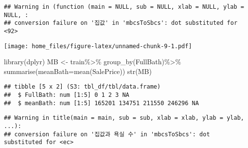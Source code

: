 \documentclass[
]{article}
\newenvironment{Shaded}{\begin{snugshade}}{\end{snugshade}}
\newcommand{\AttributeTok}[1]{\textcolor[rgb]{0.77,0.63,0.00}{#1}}
\newcommand{\FunctionTok}[1]{\textcolor[rgb]{0.00,0.00,0.00}{#1}}
\newcommand{\NormalTok}[1]{#1}
\newcommand{\OtherTok}[1]{\textcolor[rgb]{0.56,0.35,0.01}{#1}}
\newcommand{\SpecialCharTok}[1]{\textcolor[rgb]{0.00,0.00,0.00}{#1}}
\newcommand{\StringTok}[1]{\textcolor[rgb]{0.31,0.60,0.02}{#1}}
\begin{document}
\begin{verbatim}
## Warning in (function (main = NULL, sub = NULL, xlab = NULL, ylab = NULL, :
## conversion failure on '집값' in 'mbcsToSbcs': dot substituted for <92>
\end{verbatim}

\texttt{[image: home\_files/figure-latex/unnamed-chunk-9-1.pdf]}

\begin{Shaded}
\begin{Highlighting}[]
\FunctionTok{library}\NormalTok{(dplyr)}
\NormalTok{MB }\OtherTok{\textless{}{-}}\NormalTok{ train}\SpecialCharTok{\%\textgreater{}\%}
    \FunctionTok{group\_by}\NormalTok{(FullBath)}\SpecialCharTok{\%\textgreater{}\%}
    \FunctionTok{summarise}\NormalTok{(}\AttributeTok{meanBath=}\FunctionTok{mean}\NormalTok{(SalePrice))}
\FunctionTok{str}\NormalTok{(MB)}
\end{Highlighting}
\end{Shaded}

\begin{verbatim}
## tibble [5 x 2] (S3: tbl_df/tbl/data.frame)
##  $ FullBath: num [1:5] 0 1 2 3 NA
##  $ meanBath: num [1:5] 165201 134751 211550 246296 NA
\end{verbatim}

\begin{Shaded}
\end{Shaded}

\begin{verbatim}
## Warning in title(main = main, sub = sub, xlab = xlab, ylab = ylab, ...):
## conversion failure on '집값과 욕실 수' in 'mbcsToSbcs': dot substituted for <ec>
\end{verbatim}
\end{document}
